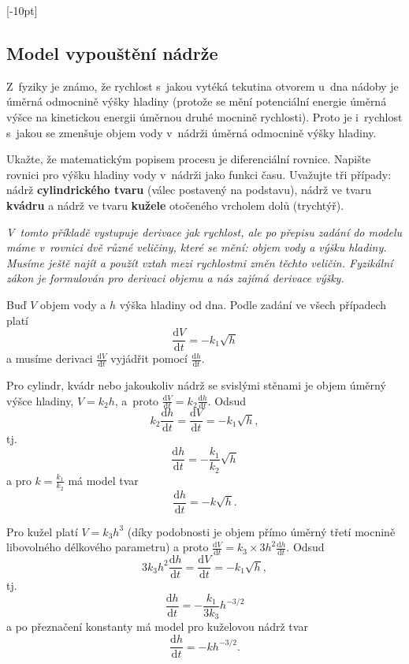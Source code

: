 \stranka

[-10pt]
\subsection{Model vypouštění nádrže} \label{vypousteni} Z fyziky je známo, že rychlost s jakou
vytéká tekutina otvorem u dna nádoby je úměrná odmocnině výšky hladiny
(protože se mění potenciální energie úměrná výšce na kinetickou
energii úměrnou druhé mocnině rychlosti). Proto je i rychlost s jakou
se zmenšuje objem vody v nádrži úměrná odmocnině výšky
hladiny.

Ukažte, že matematickým popisem procesu je diferenciální rovnice.
Napište rovnici pro výšku hladiny vody v nádrži jako funkci času.
Uvažujte tři případy:
nádrž \textbf{cylindrického tvaru} (válec postavený na podstavu),
nádrž ve tvaru
\textbf{kvádru} 
a nádrž ve tvaru \textbf{kužele} otočeného vrcholem dolů (trychtýř). 


\textit{V tomto příkladě vystupuje derivace jak rychlost, ale po přepisu zadání do modelu máme v rovnici dvě různé veličiny, které se mění: objem vody a výšku hladiny. Musíme ještě najít a použít vztah mezi rychlostmi změn těchto veličin. Fyzikální zákon je formulován pro derivaci objemu a nás zajímá derivace výšky.}

\reseni
Buď $V$ objem vody a $h$ výška hladiny od dna.
Podle zadání ve všech případech platí $$\frac {\mathrm dV}{\mathrm dt}=-k_1\sqrt h$$ a musíme derivaci $\frac {\mathrm dV}{\mathrm dt}$ vyjádřit pomocí $\frac {\mathrm dh}{\mathrm dt}$.

Pro cylindr, kvádr nebo jakoukoliv nádrž se svislými stěnami je objem úměrný výšce hladiny, $V=k_2 h$, a proto $\frac {\mathrm dV}{\mathrm dt}=k_2\frac {\mathrm dh}{\mathrm dt}$. Odsud
$$k_2\frac {\mathrm dh}{\mathrm dt}=\frac {\mathrm dV}{\mathrm dt}=-k_1\sqrt h,$$
tj.
$$\frac {\mathrm dh}{\mathrm dt}=-\frac{k_1}{k_2}\sqrt h$$
a pro $k=\frac{k_1}{k_2}$ má model tvar
$$\frac {\mathrm dh}{\mathrm dt}=-k\sqrt h.$$

Pro kužel platí $V=k_3h^3$ (díky podobnosti je objem přímo úměrný třetí mocnině libovolného délkového parametru) a proto
$\frac {\mathrm dV}{\mathrm dt}=k_3 \times 3h^2 \frac {\mathrm dh}{\mathrm dt}$.
Odsud
$$3k_3 h^2 \frac {\mathrm dh}{\mathrm dt}=\frac {\mathrm dV}{\mathrm dt}=-k_1\sqrt h,$$
tj. 
$$\frac {\mathrm dh}{\mathrm dt}=-\frac{k_1}{3k_3}h^{-3/2}$$
a po přeznačení konstanty má model pro kuželovou nádrž tvar
$$\frac {\mathrm dh}{\mathrm dt}=-kh^{-3/2}.$$


